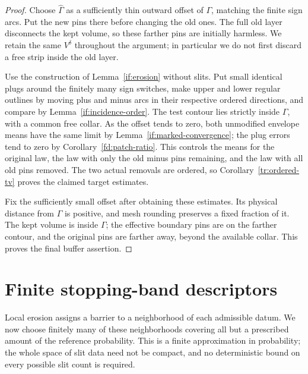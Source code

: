 \documentclass[11pt]{article}
\theoremstyle{definition}
\theoremstyle{remark}
\numberwithin{equation}{section}
\begin{document}
\begin{proof}
Choose $\widehat\Gamma$ as a sufficiently thin outward offset of
$\Gamma$, matching the finite sign arcs.  Put the new pins there
before changing the old ones.  The full old layer disconnects the
kept volume, so these farther pins are initially harmless.  We
retain the same $V^\delta$ throughout the argument; in particular
we do not first discard a free strip inside the old layer.

Use the construction of Lemma~\ref{if:erosion} without slits.
Put small identical plugs around the finitely many sign switches,
make upper and lower regular outlines by moving plus and minus
arcs in their respective ordered directions, and compare by
Lemma~\ref{if:incidence-order}.  The test contour lies strictly
inside $\Gamma$, with a common free collar.  As the offset tends
to zero, both unmodified envelope means have the same limit by
Lemma~\ref{if:marked-convergence}; the plug errors tend to zero
by Corollary~\ref{fd:patch-ratio}.  This controls the means for the
original law, the law with only the old minus pins remaining,
and the law with all old pins removed.  The two actual removals
are ordered, so Corollary~\ref{tr:ordered-tv} proves the claimed
target estimates.

Fix the sufficiently small offset after obtaining these estimates.
Its physical distance from $\Gamma$ is positive, and mesh rounding
preserves a fixed fraction of it.  The kept volume is inside
$\Gamma$; the effective boundary pins are on the farther contour,
and the original pins are farther away, beyond the available collar.
This proves the final buffer assertion.
\end{proof}

\section{Finite stopping-band descriptors}\label{de:section}

Local erosion assigns a barrier to a neighborhood of each admissible
datum. We now choose finitely many of these neighborhoods covering all
but a prescribed amount of the reference probability. This is a finite
approximation in probability; the whole space of slit data need not be
compact, and no deterministic bound on every possible slit count is
required.
\end{document}

